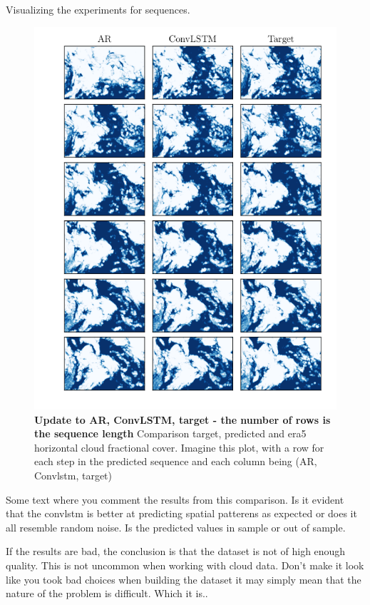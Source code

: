 Visualizing the experiments for sequences.
\begin{figure}[ht]
    \centering
    \includegraphics[sale=0.1]{python_figs/example_predicted_sequence_2010-09-01.png}
    \caption{\textbf{Update to AR, ConvLSTM, target - the number of rows is the sequence length} Comparison target, predicted and era5 horizontal cloud fractional cover. Imagine this plot, with a row for each step in the predicted sequence and each column being (AR, Convlstm, target)}
    \label{fig:target_predict_era5_horizontal}
\end{figure}

Some text where you comment the results from this comparison. Is it evident that the \acrshort{convlstm} is better at predicting spatial patterens as expected or does it all resemble random noise. Is the predicted values in sample or out of sample.

If the results are bad, the conclusion is that the dataset is not of high enough quality. This is not uncommon when working with cloud data. Don't make it look like you took bad choices when building the dataset it may simply mean that the nature of the problem is difficult. Which it is..


\clearpage
